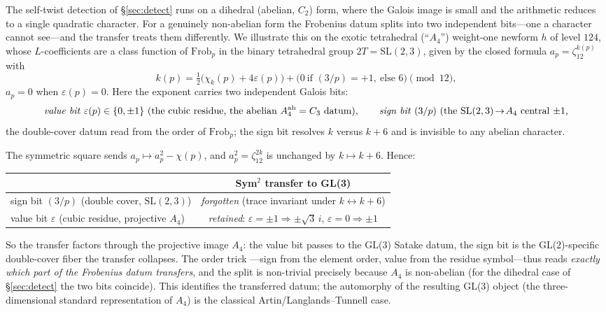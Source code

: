 \documentclass[11pt]{article}
\theoremstyle{definition}
\begin{document}
The self-twist detection of \S\ref{sec:detect} runs on a dihedral (abelian, $C_2$) form, where the
Galois image is small and the arithmetic reduces to a single quadratic character. For a genuinely
non-abelian form the Frobenius datum splits into two independent bits---one a character cannot
see---and the transfer treats them differently. We illustrate this on the exotic tetrahedral
(``$A_4$'') weight-one newform $h$ of level $124$, whose $L$-coefficients are a class function of
$\mathrm{Frob}_p$ in the binary tetrahedral group $2T=\mathrm{SL}(2,3)$, given by the closed formula
$a_p=\zeta_{12}^{k(p)}$ with
\[
  k(p)=\tfrac12\big(\chi_k(p)+4\varepsilon(p)\big)+\big(0\ \text{if }(3/p)=+1,\ \text{else }6\big)
  \pmod{12},
\]
$a_p=0$ when $\varepsilon(p)=0$. Here the exponent carries two independent Galois bits:
\[
  \text{\emph{value bit}}\ \varepsilon(p)\in\{0,\pm1\}\ \text{(the cubic residue, the abelian
  $A_4^{\mathrm{ab}}=C_3$ datum)},\qquad
  \text{\emph{sign bit}}\ (3/p)\ \text{(the $\mathrm{SL}(2,3)\!\to\!A_4$ central $\pm1$,}
\]
the double-cover datum read from the order of $\mathrm{Frob}_p$; the sign bit resolves $k$ versus
$k+6$ and is invisible to any abelian character.

The symmetric square sends $a_p\mapsto a_p^2-\chi(p)$, and $a_p^2=\zeta_{12}^{2k}$ is unchanged by
$k\mapsto k+6$. Hence:

\begin{center}
\begin{tabular}{lc}
\toprule
 & Sym$^2$ transfer to GL(3) \\
\midrule
sign bit $(3/p)$ (double cover, $\mathrm{SL}(2,3)$) & \emph{forgotten} (trace invariant under $k\!\leftrightarrow\!k{+}6$) \\
value bit $\varepsilon$ (cubic residue, projective $A_4$) & \emph{retained}: $\varepsilon=\pm1\Rightarrow\pm\sqrt3\,i$, $\varepsilon=0\Rightarrow\pm1$ \\
\bottomrule
\end{tabular}
\end{center}

So the transfer factors through the projective image $A_4$: the value bit passes to the GL(3) Satake
datum, the sign bit is the GL(2)-specific double-cover fiber the transfer collapses. The order trick
---sign from the element order, value from the residue symbol---thus reads \emph{exactly which part
of the Frobenius datum transfers}, and the split is non-trivial precisely because $A_4$ is
non-abelian (for the dihedral case of \S\ref{sec:detect} the two bits coincide). This identifies the
transferred datum; the automorphy of the resulting GL(3) object (the three-dimensional standard
representation of $A_4$) is the classical Artin/Langlands--Tunnell case.
\end{document}
